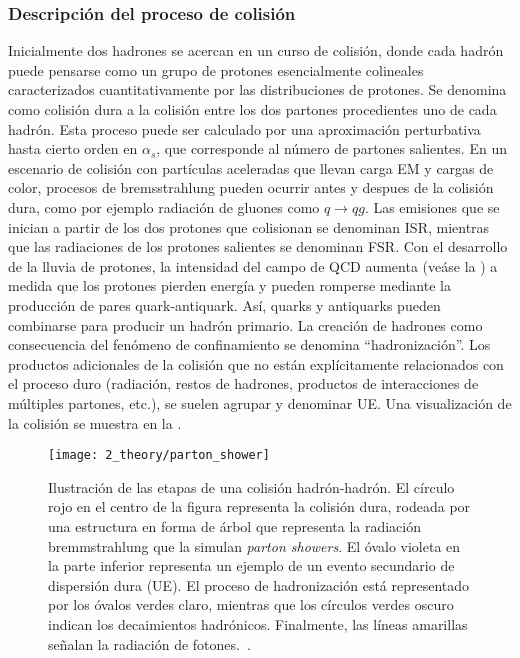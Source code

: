 \subsubsection{Descripci\'on del proceso de colisi\'on}

Inicialmente dos hadrones se acercan en un curso de colisión, donde cada hadrón puede pensarse como un grupo de protones esencialmente colineales caracterizados cuantitativamente por las distribuciones de protones.
Se denomina como colisi\'on dura a la colisi\'on entre los dos partones procedientes uno de cada hadr\'on. Esta proceso puede ser calculado por una aproximación perturbativa hasta cierto orden en \(\alpha_s\), que corresponde al número de partones salientes.
En un escenario de colisión con partículas aceleradas que llevan carga \ac{EM} y cargas de color, procesos de bremsstrahlung pueden ocurrir antes y despues de la colisi\'on dura, como por ejemplo radiación de gluones como \(q \to qg\).
Las emisiones que se inician a partir de los dos protones que colisionan se denominan \ac{ISR}, mientras que las radiaciones de los protones salientes se denominan \ac{FSR}. Con el desarrollo de la lluvia de protones, la intensidad del campo de \ac{QCD} aumenta (ve\'ase la \Fig{\ref{fig:theory:sm:mathematical:qcd:alphas}}) a medida que los protones pierden energía y pueden romperse mediante la producción de pares quark-antiquark. Así, quarks y antiquarks pueden combinarse para producir un hadrón primario. La creación de hadrones como consecuencia del fenómeno de confinamiento se denomina \enquote{hadronización}. Los productos adicionales de la colisión que no están explícitamente relacionados con el proceso duro (radiación, restos de hadrones, productos de interacciones de múltiples partones, etc.), se suelen agrupar y denominar \ac{UE}. Una visualización de la colisión \pp se muestra en la \Fig{\ref{fig:theory:sm:hadron_interactions:parton_shower}}.



\begin{figure}[ht!]
    \centering
    \texttt{[image: 2\_theory/parton\_shower]}
    \caption{Ilustraci\'on de las etapas de una colisi\'on hadr\'on-hadr\'on. El c\'irculo rojo en el centro de la figura representa la colisi\'on dura, rodeada por una estructura en forma de \'arbol que representa la radiaci\'on bremmstrahlung que la simulan \textit{parton showers}. El \'ovalo violeta en la parte inferior representa un ejemplo de un evento secundario de dispersi\'on dura (\ac{UE}). El proceso de hadronización está representado por los \'ovalos verdes claro, mientras que los c\'irculos verdes oscuro indican los decaimientos hadrónicos. Finalmente, las líneas amarillas señalan la radiación de fotones.~\cite{Hoche-2015}.}
    \label{fig:theory:sm:hadron_interactions:parton_shower}
\end{figure}



